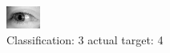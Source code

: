 \begin{figure}[h!]
\begin{center}
\includegraphics[width=0.60\columnwidth]{figures/ID3165_class_3_target_4.png}
\end{center}
\caption{ Classification: 3 actual target: 4}
\label{fig:ID3165_class_3_target_4}
\end{figure}

